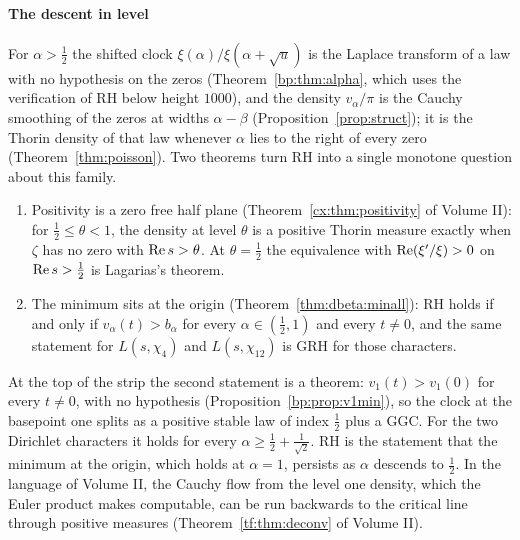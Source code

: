 \paragraph{The descent in level} For $\alpha>\frac12$ the shifted clock $\xi(\alpha)/\xi(\alpha+\sqrt u)$ is the Laplace transform of a law with no hypothesis on the zeros (Theorem~\ref{bp:thm:alpha}, which uses the verification of RH below height $1000$), and the density $v_\alpha/\pi$ is the Cauchy smoothing of the zeros at widths $\alpha-\beta$ (Proposition~\ref{prop:struct}); it is the Thorin density of that law whenever $\alpha$ lies to the right of every zero (Theorem~\ref{thm:poisson}). Two theorems turn RH into a single monotone question about this family.
\begin{enumerate}
\item Positivity is a zero free half plane (Theorem~\ref{cx:thm:positivity} of Volume II): for $\frac12\le\theta<1$, the density at level $\theta$ is a positive Thorin measure exactly when $\zeta$ has no zero with $\operatorname{Re} s>\theta$. At $\theta=\frac12$ the equivalence with $\operatorname{Re}(\xi'/\xi)>0$ on $\operatorname{Re} s>\frac12$ is Lagarias's theorem.
\item The minimum sits at the origin (Theorem~\ref{thm:dbeta:minall}): RH holds if and only if $v_\alpha(t)>b_\alpha$ for every $\alpha\in(\frac12,1)$ and every $t\ne0$, and the same statement for $L(s,\chi_4)$ and $L(s,\chi_{12})$ is GRH for those characters.
\end{enumerate}
At the top of the strip the second statement is a theorem: $v_1(t)>v_1(0)$ for every $t\ne0$, with no hypothesis (Proposition~\ref{bp:prop:v1min}), so the clock at the basepoint one splits as a positive stable law of index $\frac12$ plus a GGC. For the two Dirichlet characters it holds for every $\alpha\ge\frac12+\frac1{\sqrt2}$. RH is the statement that the minimum at the origin, which holds at $\alpha=1$, persists as $\alpha$ descends to $\frac12$. In the language of Volume II, the Cauchy flow from the level one density, which the Euler product makes computable, can be run backwards to the critical line through positive measures (Theorem~\ref{tf:thm:deconv} of Volume II).

